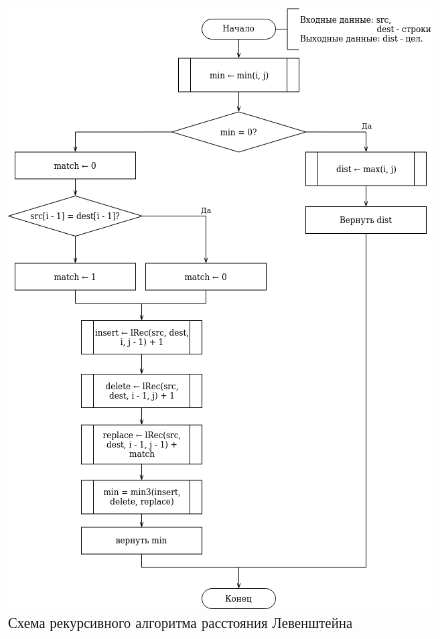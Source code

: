 \begin{figure}[h!]
	\begin{center}
		\includegraphics[scale=0.6]{assets/leven-recursive.png}
	\end{center}
	
	\caption{Схема рекурсивного алгоритма расстояния Левенштейна}
	\label{fig:l-recur}
\end{figure}

